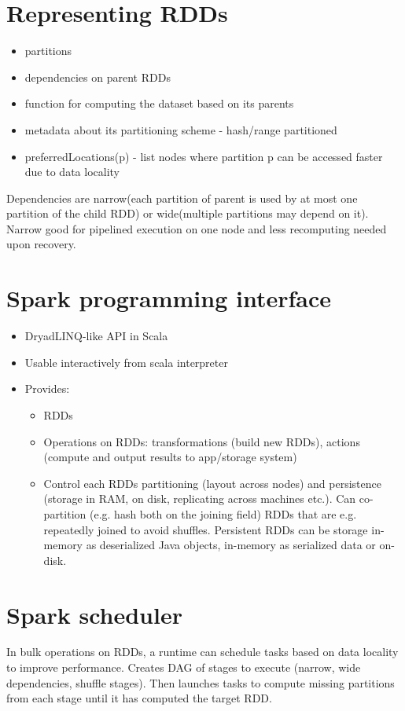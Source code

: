 \section{Representing RDDs}
\begin{itemize}
    \item partitions
    \item dependencies on parent RDDs
    \item function for computing the dataset based on its parents
    \item metadata about its partitioning scheme - hash/range partitioned
    \item preferredLocations(p) - list nodes where partition p can be accessed faster due to data locality
    
\end{itemize}
Dependencies are narrow(each partition of parent is used by at most one partition of the child RDD) or wide(multiple partitions may depend on it).
Narrow good for pipelined execution on one node and less recomputing needed upon recovery.

\section{Spark programming interface}
\begin{itemize}
    \item DryadLINQ-like API in Scala
    \item Usable interactively from scala interpreter
    \item Provides:
    \begin{itemize}
        \item RDDs
        \item Operations on RDDs: transformations (build new RDDs), actions (compute and output results to app/storage system)
        \item Control each RDDs partitioning (layout across nodes) and persistence (storage in RAM, on disk, replicating across machines etc.). Can co-partition (e.g. hash both on the joining field) RDDs that are e.g. repeatedly joined to avoid shuffles. Persistent RDDs can be storage in-memory as deserialized Java objects, in-memory as serialized data or on-disk. 
        
    \end{itemize}
    
\end{itemize}

\section{Spark scheduler}
In bulk operations on RDDs, a runtime can schedule tasks based on data locality to improve performance.
Creates DAG of stages to execute (narrow, wide dependencies, shuffle stages). Then launches tasks to compute missing partitions from each stage until it has computed the target RDD.